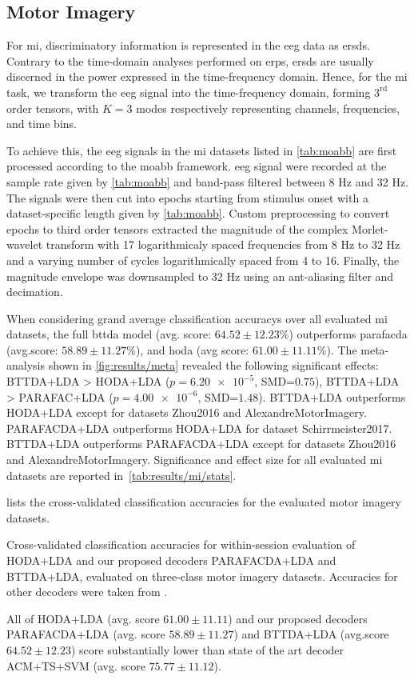 \documentclass[twocolumn]{article}
\begin{document}
\subsection{Motor Imagery}

For \ac{mi}, discriminatory information is represented in the \ac{eeg} data as
\acp{ersd}.
Contrary to the time-domain analyses performed on \acp{erp}, \acp{ersd} are usually
discerned in the power expressed in the time-frequency domain.
Hence, for the \ac{mi} task, we transform the \ac{eeg} signal into the
time-frequency domain, forming $3^\text{rd}$ order tensors, with $K=3$ modes
respectively representing channels, frequencies, and time bins.

To achieve this, the \ac{eeg} signals in the \ac{mi} datasets listed in \cref{tab:moabb}
are first processed according to the \ac{moabb} framework.
\ac{eeg} signal were recorded at the sample rate given
by \cref{tab:moabb} and band-pass filtered between 8 Hz
and 32 Hz.
The signals were then cut into epochs starting from stimulus onset with a
dataset-specific length given by \cref{tab:moabb}.
Custom preprocessing to convert epochs to third order tensors extracted
the magnitude of the complex Morlet-wavelet transform with 17 logarithmicaly spaced frequencies from 8 Hz to 32 Hz and a varying number of cycles logarithmically spaced from 4 to 16.
Finally, the magnitude envelope was downsampled to 32 Hz using an ant-aliasing filter and decimation.


When considering grand average classification accuracys over all evaluated \ac{mi} datasets,
the full \ac{bttda} model (avg. score: $64.52\pm12.23$\%)
outperforms \ac{parafacda} (avg.score: $58.89\pm11.27$\%), and \ac{hoda}
(avg score: $61.00\pm11.11$\%).
The meta-analysis shown in \cref{fig:results/meta} revealed the following significant effects:
BTTDA+LDA > HODA+LDA ($p=\num{6.20e-5}$, SMD=$0.75$),
BTTDA+LDA > PARAFAC+LDA ($p=\num{4.00e-6}$, SMD=$1.48$).
BTTDA+LDA outperforms HODA+LDA except for datasets Zhou2016 and AlexandreMotorImagery.
PARAFACDA+LDA outperforms HODA+LDA for dataset Schirrmeister2017.
BTTDA+LDA outperforms PARAFACDA+LDA except for datasets Zhou2016 and AlexandreMotorImagery.
Significance and effect size for all evaluated \ac{mi} datasets are reported in~\cref{tab:results/mi/stats}.

 lists the cross-validated classification accuracies for
the evaluated motor imagery datasets.
\begin{sidewaystable*}
	\footnotesize
	
	\caption{Cross-validated classification accuracies for within-session evaluation
		of HODA+LDA and our proposed decoders	PARAFACDA+LDA and BTTDA+LDA,
		evaluated on three-class motor imagery datasets.
		Accuracies for other decoders were taken from \textcite{Chevallier2024}.}%
	\label{tab:mi-score}%
\end{sidewaystable*}
All of HODA+LDA (avg. score $61.00\pm11.11$) and our proposed decoders PARAFACDA+LDA
(avg. score $58.89\pm11.27$) and BTTDA+LDA (avg.score $64.52\pm12.23$) score
substantially lower than state of the art decoder ACM+TS+SVM (avg. score $75.77\pm11.12$).
\end{document}

